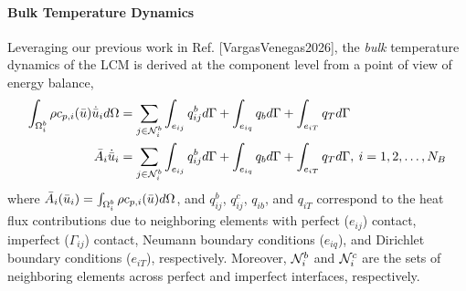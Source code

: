 \paragraph*{Bulk Temperature Dynamics} Leveraging our previous work in Ref. [VargasVenegas2026], the \emph{bulk} temperature dynamics of the LCM is derived at the component level from a point of view of energy balance,
\begin{subequations}
    \begin{align}
        \int_{\Omega^{b}_i}\rho c_{p,i}(\bar{u})\dot{\bar{u}}_i d\Omega &= \sum_{j\in\mathcal{N}^b_i}\int_{e_{ij}}q^{b}_{ij}d\Gamma + \int_{e_{iq}}q_{b}d\Gamma + \int_{e_{iT}}q_{T}d\Gamma\\
        \bar{A}_i\dot{\bar{u}}_i &= \sum_{j\in\mathcal{N}^b_i}\int_{e_{ij}}q^{b}_{ij}d\Gamma + \int_{e_{iq}}q_{b}d\Gamma + \int_{e_{iT}}q_{T}d\Gamma,\: i=1,2,\dots,N_B\label{eqn_general_lcm}
    \end{align}
\end{subequations}
where $\bar{A}_i(\bar{u}_i) = \int_{\Omega^{b}_i}\rho c_{p,i}(\bar{u})d\Omega$, and $q^{b}_{ij}$, $q^{c}_{ij}$, $q_{ib}$, and $q_{iT}$ correspond to the heat flux contributions due to neighboring elements with perfect ($e_{ij}$) contact, imperfect ($\Gamma_{ij}$) contact, Neumann boundary conditions ($e_{iq}$), and Dirichlet boundary conditions ($e_{iT}$), respectively. Moreover, $\mathcal{N}_i^b$ and $\mathcal{N}_i^c$ are the sets of neighboring elements across perfect and imperfect interfaces, respectively.

